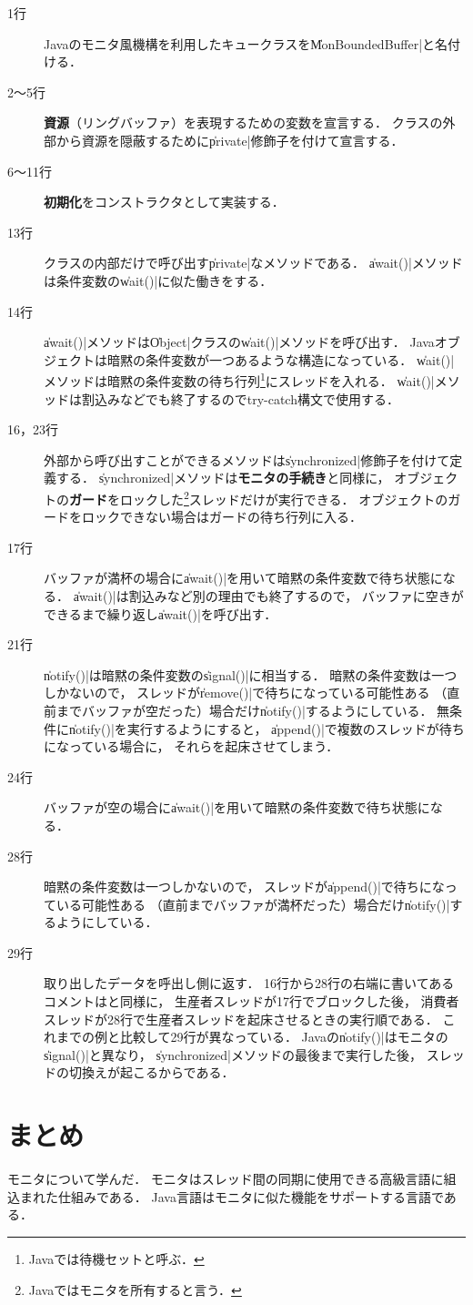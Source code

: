 \begin{description}
\item [1行]
Javaのモニタ風機構を利用したキュークラスを\|MonBoundedBuffer|と名付ける．

\item [2〜5行]
{\bf 資源}（リングバッファ）を表現するための変数を宣言する．
クラスの外部から資源を隠蔽するために\|private|修飾子を付けて宣言する．

\item [6〜11行]
{\bf 初期化}をコンストラクタとして実装する．

\item [13行]
クラスの内部だけで呼び出す\|private|なメソッドである．
\|await()|メソッドは条件変数の\|wait()|に似た働きをする．

\item [14行]
\|await()|メソッドは\|Object|クラスの\|wait()|メソッドを呼び出す．
Javaオブジェクトは暗黙の条件変数が一つあるような構造になっている．
\|wait()|メソッドは暗黙の条件変数の待ち行列\footnote{
Javaでは待機セットと呼ぶ．}にスレッドを入れる．
\|wait()|メソッドは割込みなどでも終了するのでtry-catch構文で使用する．

\item [16，23行]
外部から呼び出すことができるメソッドは\|synchronized|修飾子を付けて定義する．
\|synchronized|メソッドは{\bf モニタの手続き}と同様に，
オブジェクトの{\bf ガード}をロックした\footnote{
Javaではモニタを所有すると言う．}スレッドだけが実行できる．
オブジェクトのガードをロックできない場合はガードの待ち行列に入る．

\item [17行]
バッファが満杯の場合に\|await()|を用いて暗黙の条件変数で待ち状態になる．
\|await()|は割込みなど別の理由でも終了するので，
バッファに空きができるまで繰り返し\|await()|を呼び出す．

\item [21行]
\|notify()|は暗黙の条件変数の\|signal()|に相当する．
暗黙の条件変数は一つしかないので，
スレッドが\|remove()|で待ちになっている可能性ある
（直前までバッファが空だった）場合だけ\|notify()|するようにしている．
無条件に\|notify()|を実行するようにすると，
\|append()|で複数のスレッドが待ちになっている場合に，
それらを起床させてしまう．

\item [24行]
バッファが空の場合に\|await()|を用いて暗黙の条件変数で待ち状態になる．

\item [28行]
暗黙の条件変数は一つしかないので，
スレッドが\|append()|で待ちになっている可能性ある
（直前までバッファが満杯だった）場合だけ\|notify()|するようにしている．

\item [29行]
取り出したデータを呼出し側に返す．
16行から28行の右端に書いてあるコメントはと同様に，
生産者スレッドが17行でブロックした後，
消費者スレッドが28行で生産者スレッドを起床させるときの実行順である．
これまでの例と比較して29行が異なっている．
Javaの\|notify()|はモニタの\|signal()|と異なり，
\|synchronized|メソッドの最後まで実行した後，
スレッドの切換えが起こるからである．
\end{description}

\section{まとめ}
モニタについて学んだ．
モニタはスレッド間の同期に使用できる高級言語に組込まれた仕組みである．
Java言語はモニタに似た機能をサポートする言語である．
